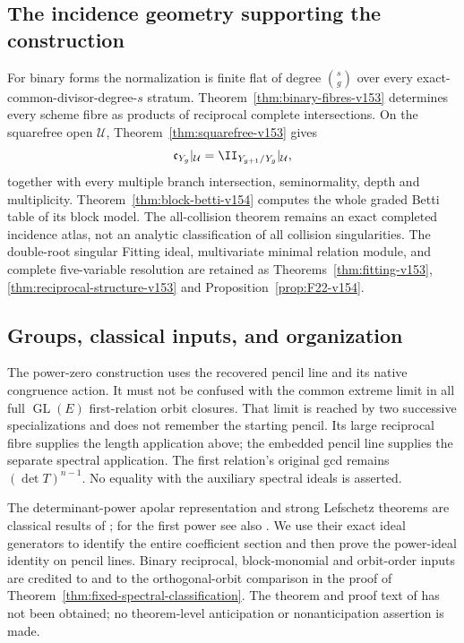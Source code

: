 \subsection{The incidence geometry supporting the construction}
For binary forms the normalization is finite flat of degree
$\binom{s}{g}$ over every exact-common-divisor-degree-$s$ stratum.
Theorem~\ref{thm:binary-fibres-v153} determines every scheme fibre
as products of reciprocal complete intersections.
On the squarefree open $\mathcal U$,
Theorem~\ref{thm:squarefree-v153} gives
\[
 \mathfrak c_{Y_g}|_{\mathcal U}
                   =\II_{Y_{g+1}/Y_g}|_{\mathcal U},
\]
together with every multiple branch intersection, seminormality,
depth and multiplicity.  Theorem~\ref{thm:block-betti-v154}
computes the whole graded Betti table of its block model.  The
all-collision theorem remains an exact completed incidence atlas,
not an analytic classification of all collision singularities.
The double-root singular Fitting ideal, multivariate minimal relation
module, and complete five-variable resolution are retained as
Theorems~\ref{thm:fitting-v153},
\ref{thm:reciprocal-structure-v153} and
Proposition~\ref{prop:F22-v154}.

\subsection{Groups, classical inputs, and organization}
The power-zero construction uses the recovered pencil line and its
native congruence action.  It must not be confused with the common
extreme limit in all full $\operatorname{GL}(E)$ first-relation
orbit closures.  That limit is reached by two successive
specializations and does not remember the starting pencil.  Its
large reciprocal fibre supplies the length application above; the
embedded pencil line supplies the separate spectral application.
The first relation's original gcd remains $(\det T)^{n-1}$.
No equality with the auxiliary spectral ideals is asserted.

The determinant-power apolar representation and strong Lefschetz
theorems are classical results of \cite{NagaokaWachi2024}; for the
first power see also \cite{ShafieiSymmetric}.  We use their exact
ideal generators to identify the entire coefficient section and then
prove the power-ideal identity on pencil lines.  Binary reciprocal,
block-monomial and orbit-order inputs are credited to
\cite{Grinberg2019,MillerSturmfels2005,FevolaMandelshtamSturmfels}
and to the orthogonal-orbit comparison in the proof of
Theorem~\ref{thm:fixed-spectral-classification}.
The theorem and proof text of \cite{Ballico93} has not been obtained;
no theorem-level anticipation or nonanticipation assertion is made.

